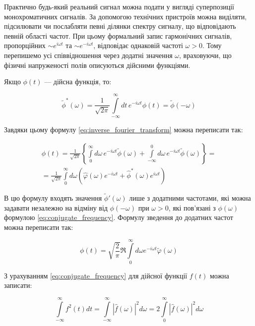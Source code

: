 Практично будь-який реальний сигнал можна подати у вигляді суперпозиції монохроматичних сигналів. За допомогою технічних пристроїв можна виділяти,
підсилювати чи послабляти певні ділянки спектру сигналу, що відповідають певній області частот. При цьому формальний запис гармонічних сигналів,
пропорційних $\sim e^{i\omega t}$ та $\sim e^{-i\omega t}$, відповідає однаковій частоті $\omega > 0$. Тому перепишемо усі співвідношення через додатні
значення $\omega$, враховуючи, що фізичні напруженості полів описуються дійсними функціями.

Якщо $\phi(t)$ --- дійсна функція, то:

\begin{equation}\label{eq:conjugate_frequency}
\tilde{\phi}^{*}(\omega) = \frac{1}{\sqrt{2\pi}} \int\limits_{-\infty}^{\infty} dt \, e^{-i\omega t} \phi(t) = \tilde{\phi}(-\omega)
\end{equation}

Завдяки цьому формулу \eqref{eq:inverse_fourier_transform} можна переписати так:

\begin{multline*}
\phi(t) = \frac{1}{\sqrt{2\pi}} \left\{ \int\limits_{0}^{\infty} d\omega \, e^{-i\omega t} \tilde{\phi}(\omega) + \int\limits_{-\infty}^{0} d\omega \,
e^{-i\omega t}
\tilde{\phi}(\omega) \right\} = \\
= \frac{1}{\sqrt{2\pi}} \int\limits_{0}^{\infty} d\omega \left( \hat{\varphi}(\omega) e^{-i\omega t} + \hat{\phi}^{*}(\omega) e^{i\omega t} \right)
\end{multline*}

В цю формулу входять значення \( \tilde{\phi}'(\omega) \) лише з додатними частотами, які можна задавати незалежно на відміну від \( \phi(-\omega) \)
при \(
\omega > 0 \), які пов’язані з \( \phi(\omega) \) формулою \eqref{eq:conjugate_frequency}. Формулу зведення до додатних частот можна переписати так:

\begin{equation}
\phi(t) = \sqrt{\frac{2}{\pi}} \Re \int\limits_{0}^{\infty} d\omega e^{-i\omega t} \tilde{\varphi}(\omega)
\label{eq:positive_frequencies}
\end{equation}

З урахуванням \eqref{eq:conjugate_frequency} для дійсної функції \( f(t) \) можна записати:

\begin{equation}
\int\limits_{-\infty}^{\infty} f^2(t) dt = \int\limits_{-\infty}^{\infty} |\hat{f}(\omega)|^2 d\omega = 2\int\limits_{0}^{\infty} |\hat{f}(\omega)|^2
d\omega
\label{eq:energy_relation}
\end{equation}

